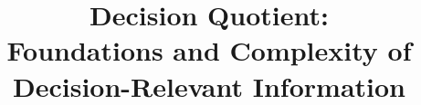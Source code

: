 \documentclass[11pt]{article}
\title{Decision Quotient:\\
Foundations and Complexity of Decision-Relevant Information}
\begin{document}
\maketitle
\pentalogyfooter

\begin{abstract}

\end{abstract}












\end{document}
